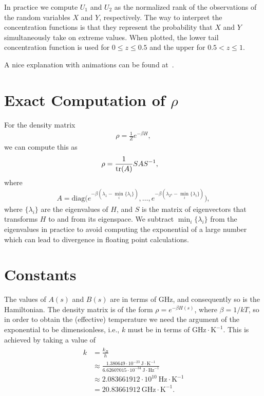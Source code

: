 In practice we compute \( U_1 \) and \( U_2 \) as the normalized rank of the observations of the random variables \( X \) and \( Y \), respectively.
The way to interpret the concentration functions is that they represent the probability that \( X \) and \( Y \) simultaneously take on extreme values.
When plotted, the lower tail concentration function is used for \( 0 \le z \le 0.5 \) and the upper for \( 0.5 < z \le 1 \).

A nice explanation with animations can be found at~\cite{charpentier_2012}.

\section{Exact Computation of \( \rho \)}\label{app:exact_rho_computation}
For the density matrix
\begin{align}
    \rho = \frac{1}{Z} e^{-\beta H},
\end{align}
we can compute this as
\begin{align}
    \rho
        &= \frac{1}{\text{tr}(A)} S A S^{-1},
\end{align}
where
\begin{align}
    A = \text{diag}\Big(e^{-\beta(\lambda_1 - \min_i\{\lambda_i\})}, \dots, e^{-\beta(\lambda_{2^n} - \min_i\{\lambda_i\})}\Big),
\end{align}
where \( \{\lambda_i\} \) are the eigenvalues of \( H \), and \( S \) is the matrix of eigenvectors that transforms \( H \) to and from its eigenspace.
We subtract \( \min_i\{\lambda_i\} \) from the eigenvalues in practice to avoid computing the exponential of a large number which can lead to divergence in floating point calculations.

\section{Constants}\label{app:constants}
The values of \( A(s) \) and \( B(s) \) are in terms of \si{\giga\hertz}, and consequently so is the Hamiltonian.
The density matrix is of the form \( \rho = e^{-\beta H(s)} \), where \( \beta = 1 / kT \), so in order to obtain the (effective) temperature we need the argument of the exponential to be dimensionless, i.e., \( k \) must be in terms of \( \si{\giga\hertz} \cdot \si{\kelvin}^{-1} \).
This is achieved by taking a value of
\begin{align}
\begin{split}
    k
        &= \frac{k_B}{h} \\
        &\approx \frac{1.380649 \cdot 10^{-23} \ \si{\joule} \cdot \si{\kelvin}^{-1}}{6.62607015 \cdot 10^{-34} \ \si{\joule} \cdot \si{\hertz}^{-1}} \\
        &\approx 2.083661912 \cdot 10^{10} \ \si{\hertz} \cdot \si{\kelvin}^{-1} \\
        &= 20.83661912 \ \si{\giga\hertz} \cdot \si{\kelvin}^{-1}.
\end{split}
\end{align}

